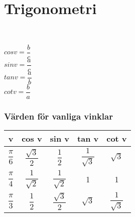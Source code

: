 \documentclass{article}
\begin{document}
\section{Trigonometri}
\\
\begin{doublespace}
$cos v = \dfrac{b}{c}$\\
$sin v = \dfrac{a}{c}$\\
$tan v = \dfrac{a}{b}$\\
$cot v = \dfrac{b}{a}$\\
\end{doublespace}
\subsubsection{Värden för vanliga vinklar}
\begin{tabular}{c|c|c|c|c}
v & cos v & sin v & tan v & cot v \\
\hline
$\dfrac{\pi}{6}$ & $\dfrac{\sqrt{3}}{2}$ & $\dfrac{1}{2}$ & $\dfrac{1}{\sqrt{3}}$  & $\sqrt{3}$\\
\hline
$\dfrac{\pi}{4}$ & $\dfrac{1}{\sqrt{2}}$ & $\dfrac{1}{\sqrt{2}}$ & 1 & 1\\
\hline
$\dfrac{\pi}{3}$ & $\dfrac{1}{2}$ & $\dfrac{\sqrt{3}}{2}$ & $\sqrt{3}$ & $\dfrac{1}{\sqrt{3}}$
\end{tabular}
\end{document}
